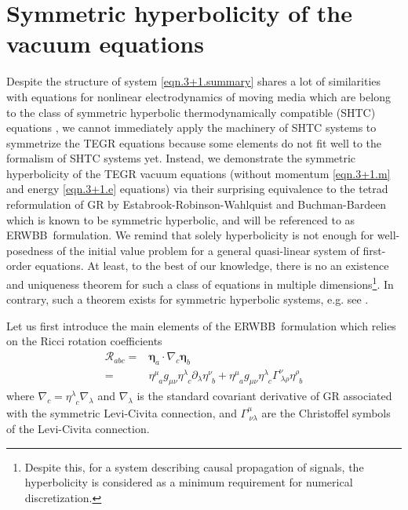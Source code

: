\documentclass[
10pt, %
a4paper, %
oneside, %
headinclude,footinclude, %
BCOR5mm, %
]{scrartcl}
\newcommand{\ERWBB}{ERWBB}
\newcommand{\pd}[1]{\partial_{#1}}
\newcommand{\itetrsymbol}{\eta}
\newcommand{\itetr}[2]{\itetrsymbol^{#1}_{\phantom{#1}#2}}
\begin{document}
\section{Symmetric hyperbolicity of the vacuum equations}

Despite the structure of system \eqref{eqn.3+1.summary} shares a lot of similarities with equations 
for nonlinear electrodynamics of moving media which are belong to the class of symmetric hyperbolic 
thermodynamically compatible (SHTC) 
equations \cite{SHTC-GENERIC-CMAT,GodRom1996b,Rom1998,Rom2001,God1961}, we cannot immediately apply 
the machinery of SHTC systems to symmetrize the TEGR equations because some elements do not fit 
well to the formalism of SHTC systems yet. Instead, we demonstrate the symmetric hyperbolicity of 
the 
TEGR vacuum equations (without momentum \eqref{eqn.3+1.m} and energy \eqref{eqn.3+1.e} equations) 
via their surprising equivalence to the tetrad reformulation of GR by 
Estabrook-Robinson-Wahlquist \cite{Estabrook1997} and Buchman-Bardeen \cite{Buchman2003} which is 
known to be 
symmetric hyperbolic, and will be referenced to as \ERWBB\ formulation. We remind that solely 
hyperbolicity 
is not enough for well-posedness of the initial value problem for a general quasi-linear system of 
first-order equations. At least, to the best of our knowledge, there is no an existence and 
uniqueness 
theorem for such a class of equations in multiple dimensions\footnote{ Despite this, for a system 
describing causal 
propagation of 	signals, the hyperbolicity is considered as a minimum requirement for numerical 
discretization.}. In contrary, such a theorem exists for symmetric hyperbolic 
systems, e.g. see \cite{Serre2007}.

Let us first introduce the main elements of the \ERWBB\ formulation which relies on the Ricci 
rotation coefficients
\begin{align}\label{eqn.Ricci.rot}
	\mathcal{R}_{abc} 
	= & \bm{\itetrsymbol}_a\cdot\nabla_c \bm{\itetrsymbol}_b \nonumber\\
	= & \itetr{\mu}{a} g_{\mu\nu} \itetr{\lambda}{c} \pd{\lambda} \itetr{\nu}{b} 
	+   \itetr{\mu}{a} g_{\mu\nu} \itetr{\lambda}{c} \Gamma^{\nu}_{\ \lambda\rho} \itetr{\rho}{b}	
\end{align}
where $ \nabla_c = \itetr{\lambda}{c} \nabla_{\lambda} $ and $ \nabla_{\lambda} $ is the standard 
covariant derivative of GR associated with the symmetric Levi-Civita connection, and $ 
\Gamma^{\mu}_{\ 
\nu\lambda} $ are the Christoffel symbols of the Levi-Civita connection.
\end{document}
